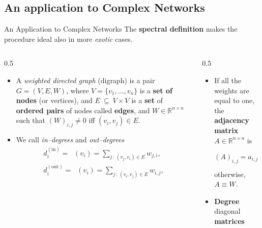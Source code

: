 \documentclass[aspectratio=169,xcolor=dvipsnames]{beamer}
\DeclareMathOperator{\degout}{\deg_{\text{out}}}
\DeclareMathOperator{\degin}{\deg_{\text{in}}}
\begin{document}
	\subsection{An application to Complex Networks}
	
	\begin{frame}{An Application to Complex Networks}
	The \alert{\textbf{spectral definition}} makes the procedure ideal also in more \emph{exotic} cases.
	
	\begin{columns}
	\begin{column}{0.5\columnwidth}
	\begin{itemize}
		\item[\faCog]<2-> A \textit{weighted directed graph} (digraph) is a pair $G = (V,E,W)$, where
		$V = \{v_1,\ldots,v_n\}$ is a \textbf{set of nodes} (or vertices), and $E~\subseteq~V \times V$ is a \textbf{set} of \textbf{ordered pairs} of nodes
		called \textbf{edges}, and $W \in \mathbb{R}^{n \times n}$ such that $(W)_{i,j} \neq 0$ iff $(v_i,v_j) \in E$.
		\item[\faCog]<3-> We call \textit{in--degrees} and \textit{out--degrees}
		\begin{equation*}
		\begin{split}
			d_i^{(\text{in})} = \degin(v_i) = \sum_{j\,:\, (v_j,v_i) \in E}w_{j,i}, \\ d_i^{(\text{out})} = \degout(v_i) = \sum_{j\,:\, (v_i,v_j) \in E}w_{i,j},
		\end{split}
		\end{equation*}
	\end{itemize}
	\end{column}
	\begin{column}{0.5\columnwidth}
	\onslide<3->{In matrix language}
	\begin{itemize}
	\item[\faWrench]<3-> If all the weights are equal to one, the \alert{\textbf{adjacency matrix}} $A \in \mathbb{R}^{n \times n}$ is
	\begin{equation*}
		(A)_{i,j} = a_{i,j} = \left\lbrace\begin{array}{cc}
			1, & \text{ if }(v_i,v_j) \in E,  \\
			0, & \text{ otherwise}.
		\end{array}\right.
	\end{equation*}
	otherwise, $A \equiv W$.
	\item[\faWrench]<4-> \alert{\textbf{Degree}} diagonal \alert{\textbf{matrices}}\vspace{-0.7em}

\end{itemize}
\end{column}
\end{columns}
\end{frame}
\end{document}
